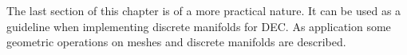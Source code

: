 
The last section of this chapter is of a more practical nature. It can be used as a guideline when implementing discrete manifolds for DEC. As application some geometric operations on meshes and discrete manifolds are described.



